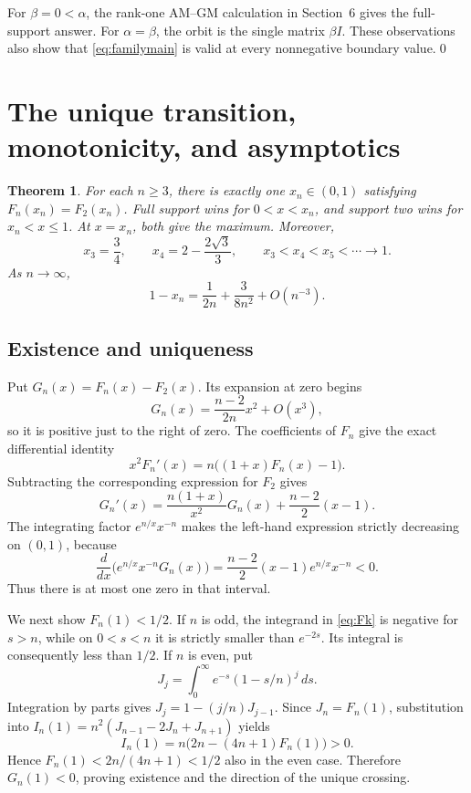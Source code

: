 \documentclass[11pt]{article}
\newtheorem{theorem}{Theorem}[section]
\theoremstyle{definition}\newtheorem{definition}[theorem]{Definition}
\theoremstyle{remark}\newtheorem{remark}[theorem]{Remark}
\begin{document}
For $\beta=0<\alpha$, the rank-one AM--GM calculation in Section~6 gives the full-support answer. For $\alpha=\beta$, the orbit is the single matrix $\beta I$. These observations also show that \eqref{eq:familymain} is valid at every nonnegative boundary value.\qed

\section{The unique transition, monotonicity, and asymptotics}
\begin{theorem}\label{thm:threshold}
For each $n\geq3$, there is exactly one $x_n\in(0,1)$ satisfying $F_n(x_n)=F_2(x_n)$. Full support wins for $0<x<x_n$, and support two wins for $x_n<x\leq1$. At $x=x_n$, both give the maximum. Moreover,
\[
 x_3=\frac34,\qquad x_4=2-\frac{2\sqrt3}{3},\qquad
 x_3<x_4<x_5<\cdots\longrightarrow1.
\]
As $n\to\infty$,
\begin{equation}\label{eq:asymptotic}
 1-x_n=\frac1{2n}+\frac3{8n^2}+O(n^{-3}).
\end{equation}
\end{theorem}

\subsection{Existence and uniqueness}
Put $G_n(x)=F_n(x)-F_2(x)$. Its expansion at zero begins
\[
 G_n(x)=\frac{n-2}{2n}x^2+O(x^3),
\]
so it is positive just to the right of zero. The coefficients of $F_n$ give the exact differential identity
\[
 x^2F_n'(x)=n\bigl((1+x)F_n(x)-1\bigr).
\]
Subtracting the corresponding expression for $F_2$ gives
\begin{equation}\label{eq:Gode}
 G_n'(x)=\frac{n(1+x)}{x^2}G_n(x)+\frac{n-2}{2}(x-1).
\end{equation}
The integrating factor $e^{n/x}x^{-n}$ makes the left-hand expression strictly decreasing on $(0,1)$, because
\[
 \frac{d}{dx}\bigl(e^{n/x}x^{-n}G_n(x)\bigr)
 =\frac{n-2}{2}(x-1)e^{n/x}x^{-n}<0.
\]
Thus there is at most one zero in that interval.

We next show $F_n(1)<1/2$. If $n$ is odd, the integrand in \eqref{eq:Fk} is negative for $s>n$, while on $0<s<n$ it is strictly smaller than $e^{-2s}$. Its integral is consequently less than $1/2$. If $n$ is even, put
\[
 J_j=\int_0^\infty e^{-s}(1-s/n)^j\,ds.
\]
Integration by parts gives $J_j=1-(j/n)J_{j-1}$. Since $J_n=F_n(1)$, substitution into $I_n(1)=n^2(J_{n-1}-2J_n+J_{n+1})$ yields
\[
 I_n(1)=n\bigl(2n-(4n+1)F_n(1)\bigr)>0.
\]
Hence $F_n(1)<2n/(4n+1)<1/2$ also in the even case. Therefore $G_n(1)<0$, proving existence and the direction of the unique crossing.
\end{document}
